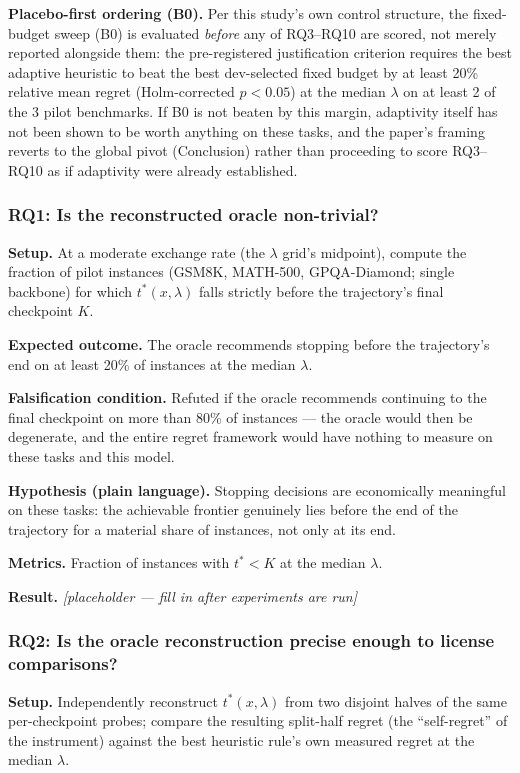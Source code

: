 \documentclass[11pt]{article}
\newcommand{\ph}{\textit{[placeholder --- fill in after experiments are run]}}
\begin{document}
\noindent\textbf{Placebo-first ordering (B0).} Per this study's own control structure, the fixed-budget sweep (B0) is evaluated \emph{before} any of RQ3--RQ10 are scored, not merely reported alongside them: the pre-registered justification criterion requires the best adaptive heuristic to beat the best dev-selected fixed budget by at least 20\% relative mean regret (Holm-corrected $p<0.05$) at the median $\lambda$ on at least 2 of the 3 pilot benchmarks. If B0 is not beaten by this margin, adaptivity itself has not been shown to be worth anything on these tasks, and the paper's framing reverts to the global pivot (Conclusion) rather than proceeding to score RQ3--RQ10 as if adaptivity were already established.

\subsubsection{RQ1: Is the reconstructed oracle non-trivial?}
\textbf{Setup.} At a moderate exchange rate (the $\lambda$ grid's midpoint), compute the fraction of pilot instances (GSM8K, MATH-500, GPQA-Diamond; single backbone) for which $t^*(x, \lambda)$ falls strictly before the trajectory's final checkpoint $K$.

\textbf{Expected outcome.} The oracle recommends stopping before the trajectory's end on at least 20\% of instances at the median $\lambda$.

\textbf{Falsification condition.} Refuted if the oracle recommends continuing to the final checkpoint on more than 80\% of instances --- the oracle would then be degenerate, and the entire regret framework would have nothing to measure on these tasks and this model.

\textbf{Hypothesis (plain language).} Stopping decisions are economically meaningful on these tasks: the achievable frontier genuinely lies before the end of the trajectory for a material share of instances, not only at its end.

\textbf{Metrics.} Fraction of instances with $t^* < K$ at the median $\lambda$.

\textbf{Result.} \ph

\subsubsection{RQ2: Is the oracle reconstruction precise enough to license comparisons?}
\textbf{Setup.} Independently reconstruct $t^*(x, \lambda)$ from two disjoint halves of the same per-checkpoint probes; compare the resulting split-half regret (the ``self-regret'' of the instrument) against the best heuristic rule's own measured regret at the median $\lambda$.
\end{document}
